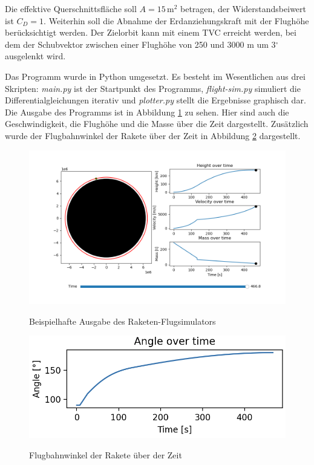 \documentclass[12pt]{article}
\begin{document}
Die effektive Querschnittsfläche soll $A = 15 \, \text{m}^2$ betragen, der Widerstandsbeiwert ist $C_D = 1$. Weiterhin soll die Abnahme der Erdanziehungskraft mit der Flughöhe berücksichtigt werden. Der Zielorbit kann mit einem TVC erreicht werden, bei dem der Schubvektor zwischen einer Flughöhe von 250 und 3000 m um 3$^\circ$ ausgelenkt wird.

Das Programm wurde in Python umgesetzt. Es besteht im Wesentlichen aus drei Skripten: \textit{main.py} ist der Startpunkt des Programms, \textit{flight-sim.py} simuliert die Differentialgleichungen iterativ und \textit{plotter.py} stellt die Ergebnisse graphisch dar. Die Ausgabe des Programms ist in Abbildung \ref{fig:output} zu sehen. Hier sind auch die Geschwindigkeit, die Flughöhe und die Masse über die Zeit dargestellt. Zusätzlich wurde der Flugbahnwinkel der Rakete über der Zeit in Abbildung \ref{fig:angle} dargestellt. 
\begin{figure}
    \centering
    \includegraphics[width=1\textwidth]{images/output.png}
    \label{fig:output}
    \caption{Beispielhafte Ausgabe des Raketen-Flugsimulators}
\end{figure}

\begin{figure}
    \centering
    \includegraphics[width=.8\textwidth]{images/angle_over_time.png}
    \label{fig:angle}
    \caption{Flugbahnwinkel der Rakete über der Zeit}
\end{figure}
\end{document}

